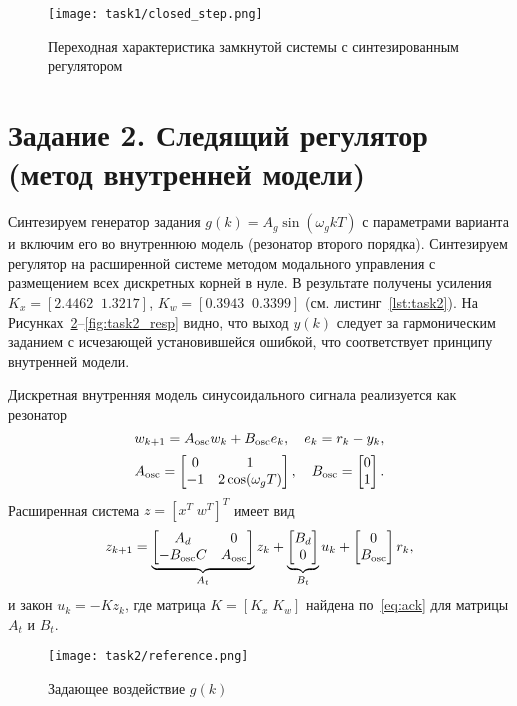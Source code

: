 \begin{figure}[H]
    \centering
    \texttt{[image: task1/closed\_step.png]}
    \caption{Переходная характеристика замкнутой системы с синтезированным регулятором}
    \label{fig:task1_closed}
\end{figure}

\section{Задание 2. Следящий регулятор (метод внутренней модели)}
Синтезируем генератор задания $g(k)=A_g\sin(\omega_g k T)$ с параметрами варианта и включим его во внутреннюю модель (резонатор второго порядка). Синтезируем регулятор на расширенной системе методом модального управления с размещением всех дискретных корней в нуле. В результате получены усиления $K_x=[2.4462\;\;1.3217]$, $K_w=[0.3943\;\;0.3399]$ (см. листинг~\ref{lst:task2}). На Рисунках~\ref{fig:task2_ref}--\ref{fig:task2_resp} видно, что выход $y(k)$ следует за гармоническим заданием с исчезающей установившейся ошибкой, что соответствует принципу внутренней модели.

Дискретная внутренняя модель синусоидального сигнала реализуется как резонатор
\[
 w_{k+1} = A_{\rm osc} w_k + B_{\rm osc} e_k,\quad e_k = r_k - y_k,
\]
\[
 A_{\rm osc} = \begin{bmatrix}0 & 1\\ -1 & 2\cos(\omega_g T)\end{bmatrix},\quad B_{\rm osc}=\begin{bmatrix}0\\1\end{bmatrix}.
\]
Расширенная система $z=[x^T\; w^T]^T$ имеет вид
\[
 z_{k+1}= \underbrace{\begin{bmatrix} A_d & 0\\ -B_{\rm osc} C & A_{\rm osc}\end{bmatrix}}_{A_t} z_k + \underbrace{\begin{bmatrix} B_d \\ 0 \end{bmatrix}}_{B_t} u_k + \begin{bmatrix}0\\ B_{\rm osc}\end{bmatrix} r_k,
\]
и закон $u_k=-K z_k$, где матрица $K=[K_x\;K_w]$ найдена по~\eqref{eq:ack} для матрицы $A_t$ и $B_t$.

\begin{figure}[H]
    \centering
    \texttt{[image: task2/reference.png]}
    \caption{Задающее воздействие $g(k)$}
    \label{fig:task2_ref}
\end{figure}

